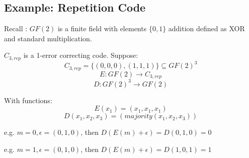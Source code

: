 \documentclass[12pt]{article}
\begin{document}
\break

\subsection{Example: Repetition Code}

Recall : $GF(2)$ is a finite field with elements $ \{0, 1\}$ addition defined as XOR and standard multiplication.


$C_{3,rep}$ is a 1-error correcting code. Suppose:
$$C_{3,rep} = \{(0,0,0), (1,1,1)\} \subseteq GF(2)^{3}$$
$$E: GF(2) \rightarrow C_{3,rep}$$ 
$$D: GF(2)^{3} \rightarrow GF(2)$$

With functions:
$$ E(x_1) = (x_1, x_1, x_1) $$
$$ D(x_1, x_2, x_3) = (majority(x_1, x_2, x_3))$$ 



e.g. $m = 0, \epsilon = (0,1,0)$, then $D(E(m) + \epsilon) = D(0,1,0) = 0$ 

e.g. $m = 1, \epsilon = (0,1,0)$, then $D(E(m) + \epsilon) = D(1,0,1) = 1$ 


\break

    
\end{document}
